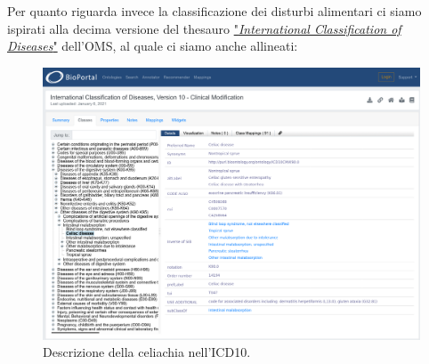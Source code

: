 \documentclass[12pt]{article}
\begin{document}
Per quanto riguarda invece la classificazione dei disturbi alimentari ci siamo ispirati alla decima versione del thesauro \href{https://bioportal.bioontology.org/ontologies/ICD10CM}{"\textit{International Classification of Diseases}"} dell'OMS, al quale ci siamo anche allineati:
\begin{figure}[H]
    \centering
    \includegraphics[width=13cm]{files/thesauroBio.png}
    \caption{Descrizione della celiachia nell'ICD10.}
\end{figure}

\end{document}
